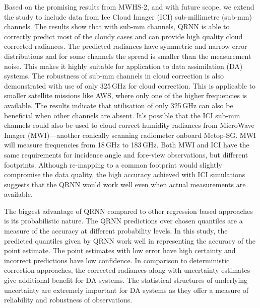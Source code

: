 \documentclass[amt, manuscript]{copernicus}
\begin{document}
Based on the promising results from MWHS-2, and with future scope, we extend the study to include data from Ice Cloud Imager (ICI) sub-millimetre (sub-mm) channels. The results show that with  sub-mm channels, QRNN is able to correctly predict most of the cloudy cases and can provide high quality cloud corrected radiances. The predicted radiances have symmetric and narrow error distributions and for some channels the spread is smaller than the measurement noise. This makes it highly suitable for application to data assimilation (DA) systems. The robustness of sub-mm channels in cloud correction is also demonstrated with use of only 325\,GHz for cloud correction. This is applicable to smaller satellite missions like AWS, where only one of the higher frequencies is available. The results indicate that utilisation of only 325\,GHz can also be beneficial when other channels are absent. It's possible that the ICI sub-mm channels could also be used to cloud correct humidity radiances from MicroWave Imager (MWI)---another conically scanning radiometer onboard Metop-SG. MWI will measure frequencies from 18\,GHz to 183\,GHz. Both MWI and ICI have the same requirements for incidence angle and fore-view observations, but different footprints. Although re-mapping to a common footprint  would slightly compromise the data quality, the high accuracy achieved with ICI simulations suggests that the QRNN would work well even when actual measurements are available.

The biggest advantage of QRNN compared to other regression based approaches is its probabilistic nature. The QRNN predictions over chosen quantiles are a measure of the accuracy at different probability levels. In this study, the predicted quantiles given by QRNN work well in representing the accuracy of the point estimate. The point estimates with low error have high certainty and incorrect predictions have low confidence. In comparison to deterministic correction approaches, the corrected radiances along with uncertainty estimates give additional benefit for DA systems. The statistical structures of underlying uncertainty are extremely important for DA systems as they offer a measure of reliability and robustness of observations.
\end{document}
